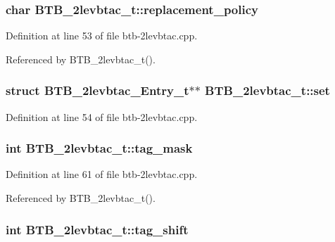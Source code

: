 \subsubsection[{replacement\_\-policy}]{\setlength{\rightskip}{0pt plus 5cm}char {\bf BTB\_\-2levbtac\_\-t::replacement\_\-policy}\hspace{0.3cm}{\tt  [protected]}}\label{classBTB__2levbtac__t_89389f10a0b29f07f3a29ff92f50da3e}




Definition at line 53 of file btb-2levbtac.cpp.

Referenced by BTB\_\-2levbtac\_\-t().
\subsubsection[{set}]{\setlength{\rightskip}{0pt plus 5cm}struct {\bf BTB\_\-2levbtac\_\-Entry\_\-t}$\ast$$\ast$ {\bf BTB\_\-2levbtac\_\-t::set}\hspace{0.3cm}{\tt  [read, protected]}}\label{classBTB__2levbtac__t_c64801806ee1d7ebf94edb2e251f5f0d}




Definition at line 54 of file btb-2levbtac.cpp.
\subsubsection[{tag\_\-mask}]{\setlength{\rightskip}{0pt plus 5cm}int {\bf BTB\_\-2levbtac\_\-t::tag\_\-mask}\hspace{0.3cm}{\tt  [protected]}}\label{classBTB__2levbtac__t_4d8beb34db63026373f2c1d84224606a}




Definition at line 61 of file btb-2levbtac.cpp.

Referenced by BTB\_\-2levbtac\_\-t().
\subsubsection[{tag\_\-shift}]{\setlength{\rightskip}{0pt plus 5cm}int {\bf BTB\_\-2levbtac\_\-t::tag\_\-shift}\hspace{0.3cm}{\tt  [protected]}}\label{classBTB__2levbtac__t_dec5b87f1920e9243e02cee9a367b5bb}




